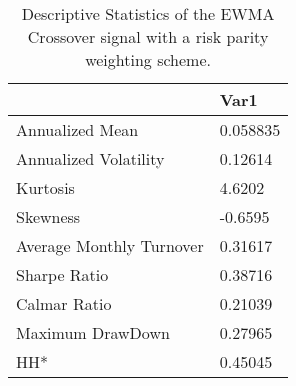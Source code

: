 \begin{table}[H]
\centering
\begin{tabular}{ll}
\hline& Var1 \\ 
\hline 
Annualized Mean & 0.058835 \\ 
Annualized Volatility & 0.12614 \\ 
Kurtosis & 4.6202 \\ 
Skewness & -0.6595 \\ 
Average Monthly Turnover & 0.31617 \\ 
Sharpe Ratio & 0.38716 \\ 
Calmar Ratio & 0.21039 \\ 
Maximum DrawDown & 0.27965 \\ 
HH* & 0.45045 \\ 
\hline
\end{tabular}
\caption{Descriptive Statistics of the EWMA Crossover signal with a risk parity weighting scheme.}
\label{MBBSRPOQ}
\end{table}